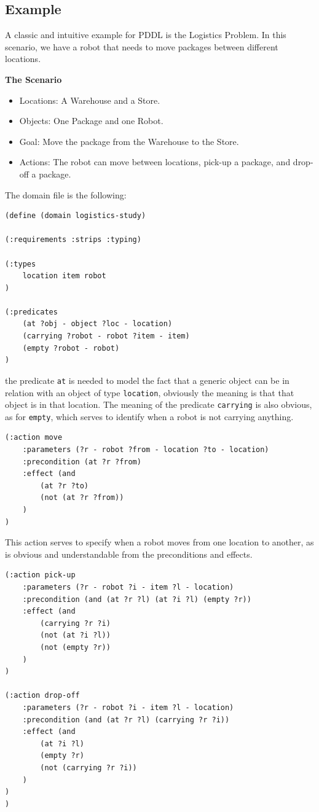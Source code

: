 \documentclass[10pt, letterpaper]{report}
\begin{document}
\subsection{Example}
A classic and intuitive example for PDDL is the Logistics Problem. In this scenario, we have a robot that needs to move packages between different locations.\bigskip

\noindent\textbf{The Scenario}\begin{itemize}
    \item  Locations: A Warehouse and a Store.
    \item Objects: One Package and one Robot.
    \item Goal: Move the package from the Warehouse to the Store.
    \item Actions: The robot can move between locations, pick-up a package, and drop-off a package.
\end{itemize}
The domain file is the following:\begin{lstlisting}
(define (domain logistics-study)

(:requirements :strips :typing)

(:types 
    location item robot
)

(:predicates 
    (at ?obj - object ?loc - location)
    (carrying ?robot - robot ?item - item)
    (empty ?robot - robot)
)
\end{lstlisting}
the predicate \texttt{at} is needed to model the fact that a generic object can be in relation with an object of type \texttt{location}, obviously the meaning is that that object is in that location. The meaning of the predicate \texttt{carrying} is also obvious, as for \texttt{empty}, which serves to identify when a robot is not carrying anything.
\begin{lstlisting}
(:action move
    :parameters (?r - robot ?from - location ?to - location)
    :precondition (at ?r ?from)
    :effect (and 
        (at ?r ?to)
        (not (at ?r ?from))
    )
)
\end{lstlisting}
This action serves to specify when a robot moves from one location to another, as is obvious and understandable from the preconditions and effects.
\begin{lstlisting}
(:action pick-up
    :parameters (?r - robot ?i - item ?l - location)
    :precondition (and (at ?r ?l) (at ?i ?l) (empty ?r))
    :effect (and 
        (carrying ?r ?i)
        (not (at ?i ?l))
        (not (empty ?r))
    )
)

(:action drop-off
    :parameters (?r - robot ?i - item ?l - location)
    :precondition (and (at ?r ?l) (carrying ?r ?i))
    :effect (and 
        (at ?i ?l)
        (empty ?r)
        (not (carrying ?r ?i))
    )
)
)
\end{lstlisting}
\end{document}
